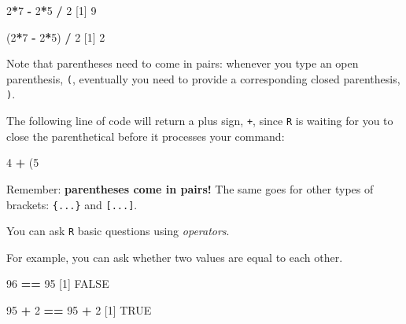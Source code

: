\documentclass[
]{book}
\newenvironment{Shaded}{\begin{snugshade}}{\end{snugshade}}
\newcommand{\ConstantTok}[1]{\textcolor[rgb]{0.56,0.35,0.01}{#1}}
\newcommand{\DecValTok}[1]{\textcolor[rgb]{0.00,0.00,0.81}{#1}}
\newcommand{\NormalTok}[1]{#1}
\newcommand{\SpecialCharTok}[1]{\textcolor[rgb]{0.81,0.36,0.00}{\textbf{#1}}}
\begin{document}
\begin{Shaded}
\begin{Highlighting}[]
\DecValTok{2}\SpecialCharTok{*}\DecValTok{7} \SpecialCharTok{{-}} \DecValTok{2}\SpecialCharTok{*}\DecValTok{5} \SpecialCharTok{/} \DecValTok{2}
\NormalTok{[}\DecValTok{1}\NormalTok{] }\DecValTok{9}
\end{Highlighting}
\end{Shaded}

\begin{Shaded}
\begin{Highlighting}[]
\NormalTok{(}\DecValTok{2}\SpecialCharTok{*}\DecValTok{7} \SpecialCharTok{{-}} \DecValTok{2}\SpecialCharTok{*}\DecValTok{5}\NormalTok{) }\SpecialCharTok{/} \DecValTok{2}
\NormalTok{[}\DecValTok{1}\NormalTok{] }\DecValTok{2}
\end{Highlighting}
\end{Shaded}

Note that parentheses need to come in pairs: whenever you type an open parenthesis, \texttt{(}, eventually you need to provide a corresponding closed parenthesis, \texttt{)}.

The following line of code will return a plus sign, \texttt{+}, since \texttt{R} is waiting for you to close the parenthetical before it processes your command:

\begin{Shaded}
\begin{Highlighting}[]
\DecValTok{4} \SpecialCharTok{+}\NormalTok{ (}\DecValTok{5}
\end{Highlighting}
\end{Shaded}

Remember: \textbf{parentheses come in pairs!} The same goes for other types of brackets: \texttt{\{...\}} and \texttt{{[}...{]}}.

You can ask \texttt{R} basic questions using \emph{operators}.

For example, you can ask whether two values are equal to each other.

\begin{Shaded}
\begin{Highlighting}[]
\DecValTok{96} \SpecialCharTok{==} \DecValTok{95}
\NormalTok{[}\DecValTok{1}\NormalTok{] }\ConstantTok{FALSE}
\end{Highlighting}
\end{Shaded}

\begin{Shaded}
\begin{Highlighting}[]
\DecValTok{95} \SpecialCharTok{+} \DecValTok{2} \SpecialCharTok{==} \DecValTok{95} \SpecialCharTok{+} \DecValTok{2}
\NormalTok{[}\DecValTok{1}\NormalTok{] }\ConstantTok{TRUE}
\end{Highlighting}
\end{Shaded}
\end{document}
